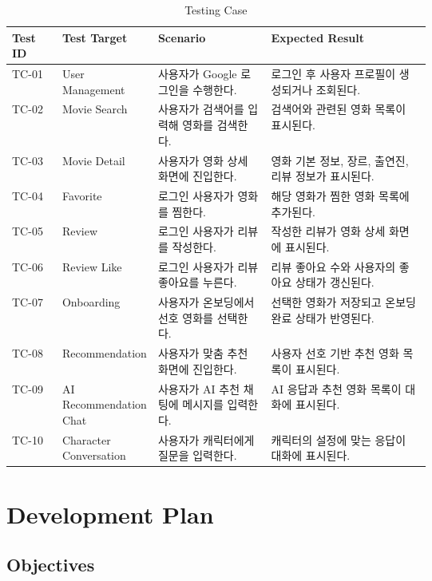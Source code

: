 \documentclass[11pt,a4paper]{article}
\renewcommand{\arraystretch}{1.18}
\begin{document}
\begin{table}[H]
\centering
\footnotesize
\setlength{\tabcolsep}{5pt}
\renewcommand{\arraystretch}{1.28}
\begin{tabularx}{\linewidth}{@{}>{\RaggedRight\arraybackslash}p{0.12\linewidth}>{\RaggedRight\arraybackslash}p{0.22\linewidth}>{\RaggedRight\arraybackslash}p{0.27\linewidth}>{\RaggedRight\arraybackslash}X@{}}
\toprule
\textbf{Test ID} & \textbf{Test Target} & \textbf{Scenario} & \textbf{Expected Result} \\
\midrule
TC-01 & User Management & 사용자가 Google 로그인을 수행한다. & 로그인 후 사용자 프로필이 생성되거나 조회된다. \\
TC-02 & Movie Search & 사용자가 검색어를 입력해 영화를 검색한다. & 검색어와 관련된 영화 목록이 표시된다. \\
TC-03 & Movie Detail & 사용자가 영화 상세 화면에 진입한다. & 영화 기본 정보, 장르, 출연진, 리뷰 정보가 표시된다. \\
TC-04 & Favorite & 로그인 사용자가 영화를 찜한다. & 해당 영화가 찜한 영화 목록에 추가된다. \\
TC-05 & Review & 로그인 사용자가 리뷰를 작성한다. & 작성한 리뷰가 영화 상세 화면에 표시된다. \\
TC-06 & Review Like & 로그인 사용자가 리뷰 좋아요를 누른다. & 리뷰 좋아요 수와 사용자의 좋아요 상태가 갱신된다. \\
TC-07 & Onboarding & 사용자가 온보딩에서 선호 영화를 선택한다. & 선택한 영화가 저장되고 온보딩 완료 상태가 반영된다. \\
TC-08 & Recommendation & 사용자가 맞춤 추천 화면에 진입한다. & 사용자 선호 기반 추천 영화 목록이 표시된다. \\
TC-09 & AI Recommendation Chat & 사용자가 AI 추천 채팅에 메시지를 입력한다. & AI 응답과 추천 영화 목록이 대화에 표시된다. \\
TC-10 & Character Conversation & 사용자가 캐릭터에게 질문을 입력한다. & 캐릭터의 설정에 맞는 응답이 대화에 표시된다. \\
\bottomrule
\end{tabularx}
\caption{Testing Case}
\end{table}

\clearpage

\hypertarget{development-plan}{%
\section{Development Plan}\label{development-plan}}

\hypertarget{objectives-7}{%
\subsection{Objectives}\label{objectives-7}}
\end{document}
